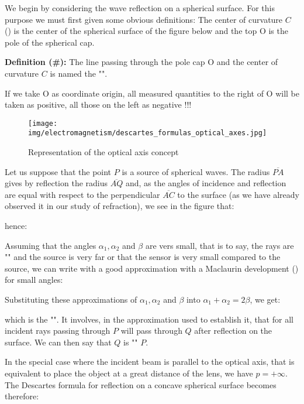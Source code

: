 	We begin by considering the wave reflection on a spherical surface. For this purpose we must first given some obvious definitions: The center of curvature $C$ () is the center of the spherical surface of the figure below and the top O is the pole of the spherical cap.
	
	\textbf{Definition (\#\mydef):} The line passing through the pole cap O and the center of curvature $C$ is named the "".
	
	If we take O as coordinate origin, all measured quantities to the right of O will be taken as positive, all those on the left as negative !!!
	
	\begin{figure}[H]
		\centering
		\texttt{[image: img/electromagnetism/descartes\_formulas\_optical\_axes.jpg]}
		\caption{Representation of the optical axis concept}
	\end{figure}
	Let us suppose that the point $P$ is a source of spherical waves. The radius $\overline{PA}$ gives by reflection the radius $\overline{AQ}$ and, as the angles of incidence and reflection are equal with respect to the perpendicular $\overline{AC}$ to the surface (as we have already observed it in our study of refraction), we see in the figure that:
	
	hence:
	
	Assuming that the angles $\alpha_1,\alpha_2$ and $\beta$ are vers small, that is to say, the rays are "" and the source is very far or that the sensor is very small compared to the source, we can write with a good approximation with a Maclaurin  development () for small angles:
	
	Substituting these approximations of $\alpha_1,\alpha_2$ and $\beta$ into $\alpha_1+\alpha_2=2\beta$, we get:
	
	which is the "". It involves, in the approximation used to establish it, that for all incident rays passing through $P$ will pass through $Q$ after reflection on the surface. We can then say that $Q$ is "" $P$.
	
	In the special case where the incident beam is parallel to the optical axis, that is equivalent to place the object at a great distance of the lens, we have $p=+\infty$. The Descartes formula for reflection on a concave spherical surface becomes therefore:
	
